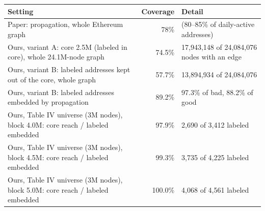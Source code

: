 \begin{tabular}{p{7.6cm} r p{5.2cm}}
\toprule
Setting & Coverage & Detail\\
\midrule
Paper: propagation, whole Ethereum graph & 78\% & (80--85\% of daily-active addresses)\\
Ours, variant A: core 2.5M (labeled in core), whole 24.1M-node graph & 74.5\% & 17,943,148 of 24,084,076 nodes with an edge\\
Ours, variant B: labeled addresses kept out of the core, whole graph & 57.7\% & 13,894,934 of 24,084,076\\
Ours, variant B: labeled addresses embedded by propagation & 89.2\% & 97.3\% of bad, 88.2\% of good\\
Ours, Table IV universe (3M nodes), block 4.0M: core reach / labeled embedded & 97.9\% & 2,690 of 3,412 labeled\\
Ours, Table IV universe (3M nodes), block 4.5M: core reach / labeled embedded & 99.3\% & 3,735 of 4,225 labeled\\
Ours, Table IV universe (3M nodes), block 5.0M: core reach / labeled embedded & 100.0\% & 4,068 of 4,561 labeled\\
\bottomrule
\end{tabular}
